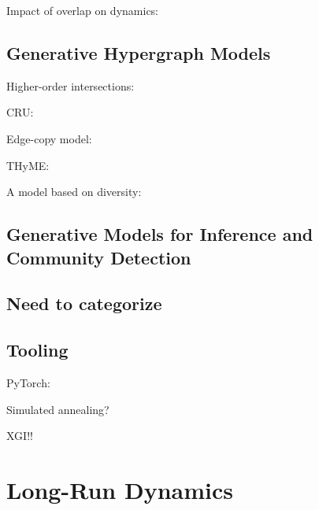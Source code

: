 \documentclass[aps,pre,reprint,superscriptaddress,nofootinbib]{revtex4-2}
\begin{document}
\cite{landrySimplicialityHigherorderNetworks2024}


\cite{leeHowHyperedgesOverlap2021}

Impact of overlap on dynamics: \cite{maliziaHyperedgeOverlapDrives2025}


\subsection{Generative Hypergraph Models}

Higher-order intersections: \cite{bensonSimplicialClosureHigherorder2018}

CRU: \cite{bensonSequencesSets2018}


Edge-copy model: \cite{heEdgeCorrelationsLink2025}

THyME: \cite{leeTHyMeTemporalHypergraph2021}

A model based on diversity: \cite{yuModelingHypergraphsDiversity2025}







\subsection{Generative Models for Inference and Community Detection}



\cite{ruggeriCommunityDetectionLarge2023}
\cite{kritschgauCommunityDetectionHypergraphs2024,chodrowGenerativeHypergraphClustering2021,chodrowNonbacktrackingSpectralClustering2023}


\cite{hoodBroadSpectrumStructure2025}

\subsection{Need to categorize}

\cite{badalyanStructureInferenceHypergraphs2024}

\subsection{Tooling}

PyTorch: \cite{pytorch}

Simulated annealing? \cite{kirkpatrickOptimizationSimulatedAnnealing1983}



XGI!! \cite{landryXGIPythonPackage2023}


\section{Long-Run Dynamics}
\end{document}
